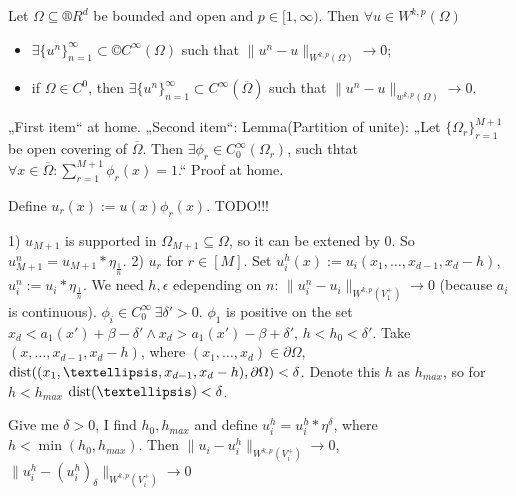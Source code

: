 \documentclass[12pt]{article}					%
\begin{document}
\begin{veta}
	Let $\Omega \subseteq ®R^d$ be bounded and open and $p \in [1, ∞)$. Then $\forall u \in W^{k, p}(\Omega)$

	\begin{itemize}
		\item $\exists \{u^n\}_{n=1}^∞ \subset ©C^∞(\Omega)$ such that $\|u^n - u\|_{W^{k, p}(\Omega)} \rightarrow 0$;
		\item if $\Omega \in C^0$, then $\exists \{u^n\}_{n=1}^∞ \subset C^∞(\overline{\Omega})$ such that $\|u^n - u\|_{w^{k, p}(\Omega)} \rightarrow 0$.
	\end{itemize}

	\begin{dukazin}
		„First item“ at home. „Second item“: Lemma(Partition of unite): „Let $\{\Omega_r\}_{r=1}^{M+1}$ be open covering of $\overline{\Omega}$. Then $\exists \phi_r \in C_0^∞(\Omega_r)$, such thtat $\forall x \in \overline{\Omega}: \sum_{r=1}^{M+1} \phi_r(x) = 1$.“ Proof at home.

		Define $u_r(x) := u(x) \phi_r(x)$. TODO!!!

		1) $u_{M+1}$ is supported in $\Omega_{M+1} \subseteq \Omega$, so it can be extened by $0$. So $u_{M+1}^n = u_{M+1} * \eta_{\frac{1}{n}}$. 2) $u_r$ for $r \in [M]$. Set $u_i^h(x) := u_i(x_1, …, x_{d-1}, x_d - h)$, $u_i^n := u_i * \eta_{\frac{1}{n}}$. We need $h, \epsilon$ edepending on $n$: $\|u_i^n - u_i\|_{W^{k, p}(V_1^+)} \rightarrow 0$ (because $a_i$ is continuous).
		$\phi_i \in C_0^∞\ \exists \delta' > 0$. $\phi_1$ is positive on the set $x_d < a_1(x') + \beta - \delta' \land x_d > a_1(x') - \beta + \delta'$, $h < h_0 < \delta'$. Take $(x, …, x_{d-1}, x_d - h)$, where $(x_1, …, x_d) \in \partial \Omega$, $\dist((x_1, …, x_{d-1}, x_d - h), \partial \Omega) < \delta$. Denote this $h$ as $h_{max}$, so for $h < h_{max}$ $\dist(…) < \delta$.

		Give me $\delta > 0$, I find $h_0, h_{max}$ and define $u_i^h = u_i^h * \eta^\delta$, where $h < \min(h_0, h_{max})$. Then
		$\|u_i - u_i^h\|_{W^{k, p}(V_i^+)} \rightarrow 0$, $\|u_i^h - (u_i^h)_\delta\|_{W^{k, p}(V_i^+)} \rightarrow 0$
	\end{dukazin}
\end{veta}
\end{document}
